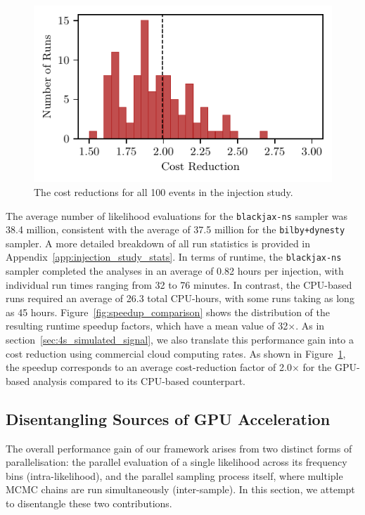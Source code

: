 \documentclass[fleqn,usenatbib]{mnras}
\begin{document}
\begin{figure}
    \centering
    \includegraphics{figures/cost_reduction.pdf}
    \caption{The cost reductions for all 100 events in the injection study.}
    \label{fig:cost_reduction}
\end{figure}

The average number of likelihood evaluations for the \texttt{blackjax-ns}
sampler was 38.4 million, consistent with the average of 37.5 million for the
\texttt{bilby+dynesty} sampler. A more detailed breakdown of all run
statistics is provided in Appendix~\ref{app:injection_study_stats}.
In terms of runtime, the \texttt{blackjax-ns} sampler completed the analyses
in an average of 0.82 hours per injection, with individual run
times ranging from 32 to 76 minutes.
In contrast, the CPU-based runs
required an average of 26.3 total CPU-hours, with some runs taking as long as 
45 hours. 
Figure~\ref{fig:speedup_comparison} shows the distribution of the
resulting runtime speedup factors, which have a mean value of
32$\times$. As in 
section~\ref{sec:4s_simulated_signal}, we also translate this performance 
gain into a cost reduction using commercial cloud computing rates.
As shown in Figure~\ref{fig:cost_reduction}, the speedup
corresponds to an average cost-reduction factor of 2.0$\times$ for the
GPU-based analysis compared to its CPU-based counterpart.

\subsection{Disentangling Sources of GPU Acceleration}
\label{sec:disentangling_acceleration}

The overall performance gain of our framework arises from two distinct
forms of parallelisation: the parallel evaluation of a single
likelihood across its frequency bins (intra-likelihood), and the
parallel sampling process itself, where multiple MCMC chains are run
simultaneously (inter-sample). In this section, we attempt to disentangle
these two contributions.
\end{document}
